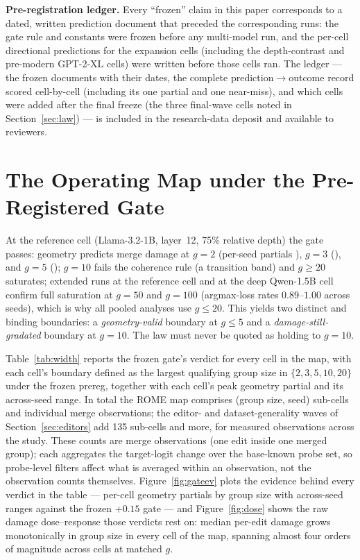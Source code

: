 \documentclass[preprint,12pt]{elsarticle}
\begin{document}
\textbf{Pre-registration ledger.} Every ``frozen'' claim in this paper corresponds to
a dated, written prediction document that preceded the corresponding runs: the gate
rule and constants were frozen before any multi-model run, and the per-cell directional
predictions for the expansion cells (including the depth-contrast and pre-modern
GPT-2-XL cells) were written before those cells ran. The ledger --- the frozen
documents with their dates, the complete prediction$\to$outcome record scored
cell-by-cell (including its one partial and one near-miss), and which cells were added
after the final freeze (the three final-wave cells noted in Section~\ref{sec:law}) ---
is included in the research-data deposit and available to reviewers.

\section{The Operating Map under the Pre-Registered Gate}\label{sec:map}
At the reference cell (Llama-3.2-1B, layer~12, 75\% relative depth) the gate passes:
geometry predicts merge damage at $g{=}2$ (per-seed partials ), $g{=}3$
(), and $g{=}5$ (); $g{=}10$ fails the coherence
rule (a transition band) and $g\geq20$ saturates; extended runs at the reference cell and
at the deep Qwen-1.5B cell confirm full saturation at $g{=}50$ and $g{=}100$ (argmax-loss
rates $0.89$--$1.00$ across seeds), which is why all pooled analyses use $g\leq20$. This
yields two distinct and binding
boundaries: a \emph{geometry-valid} boundary at $g\leq5$ and a \emph{damage-still-gradated}
boundary at $g{=}10$. The law must never be quoted as holding to $g{=}10$.

Table~\ref{tab:width} reports the frozen gate's verdict for every cell in the map, with
each cell's boundary defined as the largest qualifying group size in $\{2,3,5,10,20\}$
under the frozen prereg, together with each cell's peak geometry partial and its
across-seed range. In total the ROME map comprises \nSubcells{} (group size, seed)
sub-cells and \nObsRome{} individual merge observations; the editor- and
dataset-generality waves of Section~\ref{sec:editors} add 135 sub-cells and
\nObsEditors{} more, for \nObsTotal{} measured observations across the study. These
counts are merge observations (one edit inside one merged group); each aggregates the
target-logit change over the base-known probe set, so probe-level filters affect what
is averaged within an observation, not the observation counts themselves.
Figure~\ref{fig:gateev} plots the evidence behind every verdict in the table ---
per-cell geometry partials by group size with across-seed ranges against the frozen
$+0.15$ gate --- and Figure~\ref{fig:dose} shows the raw damage dose--response those
verdicts rest on: median per-edit damage grows monotonically in group size in every
cell of the map, spanning almost four orders of magnitude across cells at matched $g$.
\end{document}
